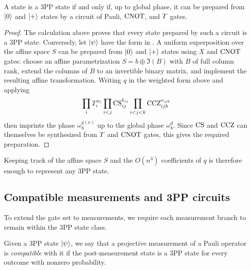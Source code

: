 \begin{proposition}\label{prop:3pp-preparation}
    A state is a 3PP state if and only if, up to global phase, it can be prepared from $|0\rangle$ and $|+\rangle$ states by a circuit of Pauli, $\operatorname{CNOT}$, and $T$ gates.
\end{proposition}
\begin{proof}
    The calculation above proves that every state prepared by such a circuit is a 3PP state. Conversely, let $|\psi\rangle$ have the form in . A uniform superposition over the affine space $S$ can be prepared from $|0\rangle$ and $|+\rangle$ states using $X$ and $\operatorname{CNOT}$ gates: choose an affine parametrization $S=b\oplus\Im(B)$ with $B$ of full column rank, extend the columns of $B$ to an invertible binary matrix, and implement the resulting affine transformation. Writing $q$ in the weighted form above and applying
    \[
        \prod_i T_i^{a_i}
        \prod_{i<j}\operatorname{CS}_{ij}^{b_{ij}}
        \prod_{i<j<k}\operatorname{CCZ}_{ijk}^{c_{ijk}}
    \]
    then imprints the phase $\omega_8^{q(x)}$ up to the global phase $\omega_8^d$.
    Since $\operatorname{CS}$ and $\operatorname{CCZ}$ can themselves be synthesized from $T$ and $\operatorname{CNOT}$ gates, this gives the required preparation.
\end{proof}

Keeping track of the affine space $S$ and the $O(n^3)$ coefficients of $q$ is therefore enough to represent any 3PP state.

\subsection{Compatible measurements and 3PP circuits}\label{sec:compatible-measurements}

To extend the gate set to measurements, we require each measurement branch to remain within the 3PP state class.

\begin{definition}\label{def:compatible-measurement}
    Given a 3PP state $|\psi\rangle$, we say that a projective measurement of a Pauli operator is \emph{compatible} with it if the post-measurement state is a 3PP state for every outcome with nonzero probability.
\end{definition}


